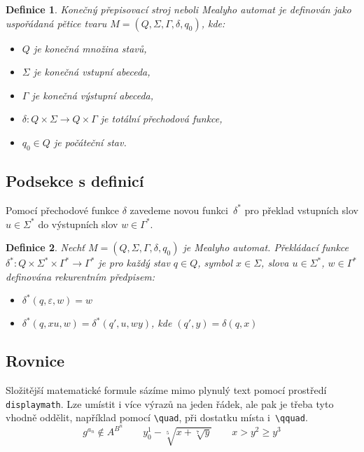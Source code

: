 \documentclass[a4paper, twocolumn, 11pt]{article}
\newtheorem{definice}{Definice} %
\begin{document}
    
    \label{prvni_definice}
    \begin{definice}
        \emph{Konečný přepisovací stroj} neboli \emph{Mea\-lyho automat} je definován jako uspořádaná pětice tvaru $M=(Q, \varSigma, \varGamma, \delta, q_0)$, kde:

        \begin{itemize}
            \item $Q$ je konečná množina \emph{stavů},

            \item $\varSigma$ je konečná \emph{vstupní abeceda},

            \item $\varGamma$ je konečná \emph{výstupní abeceda},

            \item $\delta: Q \times \varSigma \rightarrow Q \times \varGamma$ je totální \emph{přechodová funkce},

            \item $q_0 \in Q$ je \emph{počáteční stav}.
        \end{itemize}
    \end{definice}

    \subsection{Podsekce s definicí}
    Pomocí přechodové funkce $\delta$ zavedeme novou funkci~$\delta^*$ pro překlad vstupních slov $u \in \varSigma^*$ do výstupních slov $w \in \varGamma^*$.

    \begin{definice}
        Nechť $M=(Q, \varSigma, \varGamma, \delta, q_0)$ je Mealyho automat. \emph{Překládací funkce} $\delta^*: Q \times \varSigma^* \times \varGamma^* \rightarrow \varGamma^*$ je pro každý stav $q \in Q$, symbol $x \in \varSigma$, slova $u \in \varSigma^*$, $w \in \varGamma^*$ definována rekurentním předpisem:

        \begin{itemize}
            \item $\delta^*(q, \varepsilon, w) = w$

            \item $\delta^*(q, xu, w) = \delta^*(q', u, wy)$, kde $(q', y) = \delta(q, x)$
        \end{itemize}
    \end{definice}

    \subsection{Rovnice}
    Složitější matematické formule sázíme mimo plynulý
    text pomocí prostředí \verb|displaymath|. Lze umístit i více
    výrazů na jeden řádek, ale pak je třeba tyto vhodně
    oddělit, například pomocí \verb|\quad|, při dostatku místa
    i~\verb|\qquad|.
    $$g^{a_n} \notin A^{B^n} \qquad y_{0}^{1} - \sqrt[5]{x + \sqrt[7]{y}} \qquad x > y^2 \geq y^3$$
\end{document}
